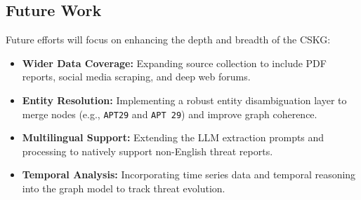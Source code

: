 \subsection{Future Work}
Future efforts will focus on enhancing the depth and breadth of the CSKG:
\begin{itemize}
    \item \textbf{Wider Data Coverage:} Expanding source collection to include PDF reports, social media scraping, and deep web forums.
    \item \textbf{Entity Resolution:} Implementing a robust entity disambiguation layer to merge nodes (e.g., \texttt{APT29} and \texttt{APT 29}) and improve graph coherence.
    \item \textbf{Multilingual Support:} Extending the LLM extraction prompts and processing to natively support non-English threat reports.
    \item \textbf{Temporal Analysis:} Incorporating time series data and temporal reasoning into the graph model to track threat evolution.
\end{itemize}
